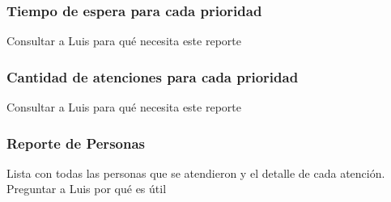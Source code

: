 \subsubsection{Tiempo de espera para cada prioridad}
Consultar a Luis para qué necesita este reporte
\subsubsection{Cantidad de atenciones para cada prioridad}
Consultar a Luis para qué necesita este reporte
\subsubsection{Reporte de Personas}
Lista con todas las personas que se atendieron y el detalle de cada atención. Preguntar a Luis por qué es útil